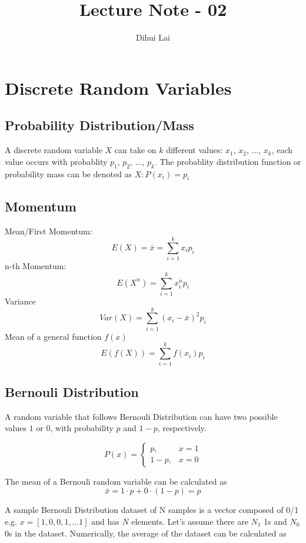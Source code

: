\documentclass[12pt, oneside]{article}
\title{Lecture Note - 02}
\author{Dihui Lai}
\begin{document}
\maketitle
\tableofcontents

\vspace{.25in}

\section{Discrete Random Variables}

\subsection{Probability Distribution/Mass}

A discrete random variable $X$ can take on $k$ different values: $x_1$, $x_2$, ..., $x_k$, each value occurs with probablity $p_1$, $p_2$, ..., $p_k$. The probablity distribution function or probability mass can be denoted as $X: P(x_i)=p_i$

\subsection{Momentum}

Mean/First Momentum:
$$E(X)=\bar{x}=\sum\limits_{i=1}^k x_i p_i$$
n-th Momentum:
$$E(X^n)=\sum\limits_{i=1}^k x_i^n p_i$$
Variance
$$Var(X)=\sum\limits_{i=1}^k (x_i-\bar{x})^2 p_i$$
Mean of a general function $f(x)$
$$E(f(X))=\sum\limits_{i=1}^k f(x_i) p_i$$

\subsection{Bernouli Distribution}
A random variable that follows Bernouli Distribution can have two possible values $1$ or $0$, with probability $p$ and $1-p$, respectively.

\begin{equation}
P(x)=
\begin{cases}
p, &x=1\\
1-p, &x=0
\end{cases}
\end{equation}

The mean of a Bernouli random variable can be calculated as 
$$\bar{x}=1\cdot p+0\cdot(1-p)=p$$

A sample Bernouli Distribution dataset of N samples is a vector composed of 0/1 e.g. $x=[1, 0, 0, 1, ...1]$ and has $N$ elements. Let's assume there are $N_1$ 1s and $N_0$ 0s in the dataset. Numerically, the average of the dataset can be calculated as 
\end{document}
